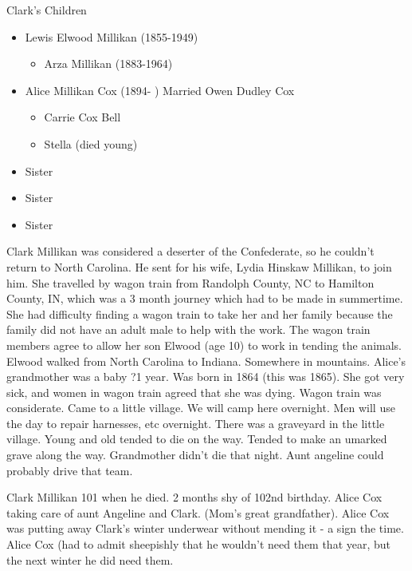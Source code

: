 \documentclass[
]{book}
\providecommand{\tightlist}{%
  \setlength{\itemsep}{0pt}\setlength{\parskip}{0pt}}
\begin{document}
Clark's Children

\begin{itemize}
\tightlist
\item
  Lewis Elwood Millikan (1855-1949)

  \begin{itemize}
  \tightlist
  \item
    Arza Millikan (1883-1964)
  \end{itemize}
\item
  Alice Millikan Cox (1894- ) Married Owen Dudley Cox

  \begin{itemize}
  \tightlist
  \item
    Carrie Cox Bell
  \item
    Stella (died young)
  \end{itemize}
\item
  Sister
\item
  Sister
\item
  Sister
\end{itemize}

Clark Millikan was considered a deserter of the Confederate, so he couldn't return to North Carolina. He sent for his wife, Lydia Hinskaw Millikan, to join him. She travelled by wagon train from Randolph County, NC to Hamilton County, IN, which was a 3 month journey which had to be made in summertime. She had difficulty finding a wagon train to take her and her family because the family did not have an adult male to help with the work. The wagon train members agree to allow her son Elwood (age 10) to work in tending the animals. Elwood walked from North Carolina to Indiana. Somewhere in mountains. Alice's grandmother was a baby ?1 year. Was born in 1864 (this was 1865). She got very sick, and women in wagon train agreed that she was dying. Wagon train was considerate. Came to a little village. We will camp here overnight. Men will use the day to repair harnesses, etc overnight. There was a graveyard in the little village. Young and old tended to die on the way. Tended to make an umarked grave along the way. Grandmother didn't die that night. Aunt angeline could probably drive that team.

Clark Millikan 101 when he died. 2 months shy of 102nd birthday. Alice Cox taking care of aunt Angeline and Clark. (Mom's great grandfather). Alice Cox was putting away Clark's winter underwear without mending it - a sign the time. Alice Cox (had to admit sheepishly that he wouldn't need them that year, but the next winter he did need them.
\end{document}
